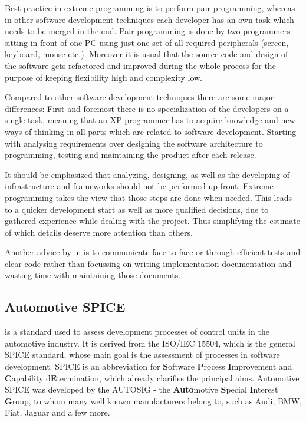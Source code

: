 Best practice in extreme programming is to perform pair programming, whereas in other software development techniques each developer has an 
own task which needs to be merged in the end. Pair programming is done by two programmers sitting in front of one PC using just one set of 
all required peripherals (screen, keyboard, mouse etc.). Moreover it is usual that the source code and design of the software gets refactored 
and improved during the whole process for the purpose of keeping flexibility high and complexity low.

Compared to other software development techniques there are some major differences: First and foremost there is no specialization of the 
developers on a single task, meaning that an XP programmer has to acquire knowledge and new ways of thinking in all parts 
which are related to software development. Starting with analysing requirements over designing the software architecture to programming, 
testing and maintaining the product after each release.

It should be emphasized that analyzing, designing, as well as the developing of infrastructure and frameworks should not be performed 
up-front. Extreme programming takes the view that those steps are done when needed. This leads to a quicker development start as well 
as more qualified decisions, due to gathered experience while dealing with the project. Thus simplifying the estimate of which details 
deserve more attention than others.

Another advice by \citeauthor{BECK} in \cite{BECK} is to communicate face-to-face or through efficient tests and 
clear code rather than focussing on writing implementation documentation and wasting time with maintaining those documents.

\subsection{Automotive SPICE}

\cite{AUTOSPICE} is a standard used to assess development processes of control units in the automotive industry. It is derived from the 
ISO/IEC $15504$, which is the general SPICE standard, whose main goal is the assessment of processes in software development. SPICE is an 
abbreviation for \textbf{S}oftware \textbf{P}rocess \textbf{I}mprovement and \textbf{C}apability d\textbf{E}termination, which already 
clarifies the principal aims. Automotive SPICE was developed by the AUTOSIG - the \textbf{Auto}motive \textbf{S}pecial \textbf{I}nterest 
\textbf{G}roup, to whom many well known manufacturers belong to, such as Audi, BMW, Fiat, Jaguar and a few more.

